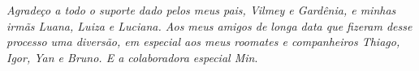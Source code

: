 \begin{agradecimentos}
 \textit{Agradeço a todo o suporte dado pelos meus pais, Vilmey e Gardênia, e minhas irmãs Luana, Luiza e Luciana. Aos meus amigos de longa data que fizeram desse processo uma diversão, em especial aos meus roomates e companheiros Thiago, Igor, Yan e Bruno. E a colaboradora especial Min}.

\end{agradecimentos}
